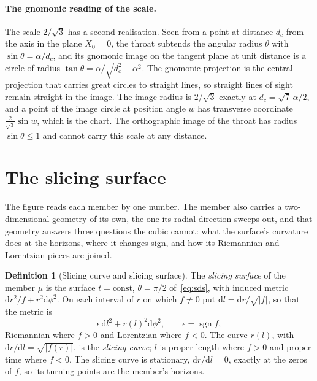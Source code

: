 \documentclass[11pt]{article}
\theoremstyle{plain}
\theoremstyle{definition}
\newtheorem{definition}[theorem]{Definition}
\theoremstyle{remark}
\newcommand{\dd}{\mathrm{d}}
\begin{document}
\paragraph{The gnomonic reading of the scale.} The scale $2/\sqrt3$ has a second realisation. Seen from a point
at distance $d_{c}$ from the axis in the plane $X_{0}=0$, the throat subtends the angular radius $\theta$ with
$\sin\theta=\alpha/d_{c}$, and its gnomonic image on the tangent plane at unit distance is a circle of radius
$\tan\theta=\alpha/\sqrt{d_{c}^{2}-\alpha^{2}}$. The gnomonic projection is the central projection that carries
great circles to straight lines, so straight lines of sight remain straight in the image. The image radius is
$2/\sqrt3$ exactly at $d_{c}=\sqrt7\,\alpha/2$, and a point of the image circle at position angle $w$ has transverse
coordinate $\tfrac{2}{\sqrt3}\sin w$, which is the chart. The orthographic image of the throat has radius
$\sin\theta\le1$ and cannot carry this scale at any distance.

\section{The slicing surface}\label{sec:surface}

The figure reads each member by one number. The member also carries a two-dimensional geometry of its own,
the one its radial direction sweeps out, and that geometry answers three questions the cubic cannot: what the
surface's curvature does at the horizons, where it changes sign, and how its Riemannian and Lorentzian pieces
are joined.

\begin{definition}[Slicing curve and slicing surface]\label{def:surface}
The \emph{slicing surface} of the member $\mu$ is the surface $t=\text{const}$, $\theta=\pi/2$ of~\eqref{eq:sds},
with induced metric $\dd r^{2}/f+r^{2}\dd\phi^{2}$. On each interval of $r$ on which $f\neq0$ put
$\dd l=\dd r/\sqrt{|f|}$, so that the metric is
\begin{equation}\label{eq:surface}
\epsilon\,\dd l^{2}+r(l)^{2}\dd\phi^{2},\qquad \epsilon=\operatorname{sgn}f,
\end{equation}
Riemannian where $f>0$ and Lorentzian where $f<0$. The curve $r(l)$, with $\dd r/\dd l=\sqrt{|f(r)|}$, is the
\emph{slicing curve}; $l$ is proper length where $f>0$ and proper time where $f<0$. The slicing curve is stationary,
$\dd r/\dd l=0$, exactly at the zeros of $f$, so its turning points are the member's horizons.
\end{definition}
\end{document}
